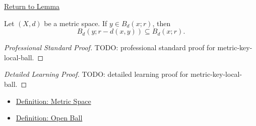 \newpage
{}
\label{prf:metric-key-local-ball}

\begin{remark*}[Return]
\hyperref[lem:metric-key-local-ball]{Return to Lemma}
\end{remark*}

\begin{lemma*}
Let \((X,d)\) be a metric space.  If \(y\in B_d(x;r)\), then
\[
  B_d(y;r-d(x,y))\subseteq B_d(x;r).
\]
\end{lemma*}

\begin{proof}[Professional Standard Proof]
\LRAProofBodyStart
TODO: professional standard proof for metric-key-local-ball.
\end{proof}

\begin{proof}[Detailed Learning Proof]
\LRAProofBodyStart
TODO: detailed learning proof for metric-key-local-ball.
\end{proof}

\begin{remark*}
\end{remark*}

\begin{dependencies}
\begin{itemize}
  \item \hyperref[def:metric-space]{Definition: Metric Space}
  \item \hyperref[def:metric-open-ball]{Definition: Open Ball}
\end{itemize}
\end{dependencies}

\clearpage

